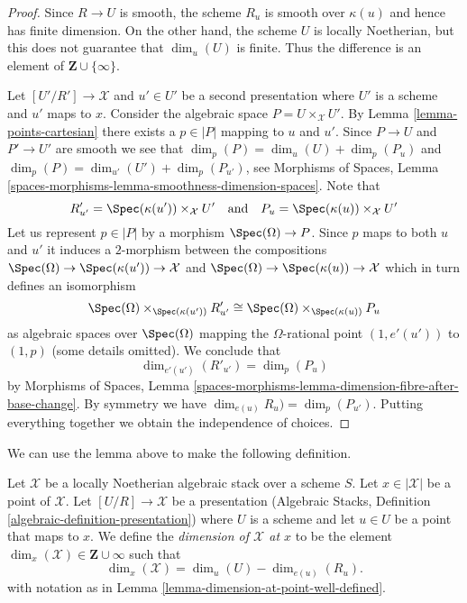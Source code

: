 \begin{proof}
Since $R \to U$ is smooth, the scheme $R_u$ is smooth over $\kappa(u)$
and hence has finite dimension. On the other hand, the scheme $U$
is locally Noetherian, but this does not guarantee that
$\dim_u(U)$ is finite. Thus the difference is an element of
$\mathbf{Z} \cup \{\infty\}$.

\medskip\noindent
Let $[U'/R'] \to \mathcal{X}$ and $u' \in U'$ be a second presentation
where $U'$ is a scheme and $u'$ maps to $x$. Consider the algebraic
space $P = U \times_\mathcal{X} U'$. By
Lemma \ref{lemma-points-cartesian} there exists a $p \in |P|$ mapping to
$u$ and $u'$. Since $P \to U$ and $P' \to U'$ are smooth we see that
$\dim_p(P) = \dim_u(U) + \dim_p(P_u)$ and
$\dim_p(P) = \dim_{u'}(U') + \dim_p(P_{u'})$, see
Morphisms of Spaces, Lemma
\ref{spaces-morphisms-lemma-smoothness-dimension-spaces}.
Note that
$$
R'_{u'} = \Spec(\kappa(u')) \times_\mathcal{X} U'
\quad\text{and}\quad
P_u = \Spec(\kappa(u)) \times_\mathcal{X} U'
$$
Let us represent $p \in |P|$ by a morphism $\Spec(\Omega) \to P$.
Since $p$ maps to both $u$ and $u'$ it induces a $2$-morphism
between the compositions
$\Spec(\Omega) \to \Spec(\kappa(u')) \to \mathcal{X}$ and
$\Spec(\Omega) \to \Spec(\kappa(u)) \to \mathcal{X}$
which in turn defines an isomorphism
$$
\Spec(\Omega) \times_{\Spec(\kappa(u'))} R'_{u'}
\cong
\Spec(\Omega) \times_{\Spec(\kappa(u))} P_u
$$
as algebraic spaces over $\Spec(\Omega)$ mapping the $\Omega$-rational
point $(1, e'(u'))$ to $(1, p)$ (some details omitted). We conclude that
$$
\dim_{e'(u')}(R'_{u'}) = \dim_p(P_u)
$$
by Morphisms of Spaces, Lemma
\ref{spaces-morphisms-lemma-dimension-fibre-after-base-change}.
By symmetry we have
$\dim_{e(u)}R_u) = \dim_p(P_{u'})$.
Putting everything together we obtain the independence of choices.
\end{proof}

\noindent
We can use the lemma above to make the following definition.

\begin{definition}
\label{definition-dimension-at-point}
Let $\mathcal{X}$ be a locally Noetherian algebraic stack over a scheme $S$.
Let $x \in |\mathcal{X}|$ be a point of $\mathcal{X}$.
Let $[U/R] \to \mathcal{X}$ be a presentation
(Algebraic Stacks, Definition \ref{algebraic-definition-presentation})
where $U$ is a scheme
and let $u \in U$ be a point that maps to $x$.
We define the {\it dimension of $\mathcal{X}$ at $x$} to be
the element $\dim_x(\mathcal{X}) \in \mathbf{Z} \cup \infty$
such that 
$$
\dim_x(\mathcal{X}) = \dim_u(U)-\dim_{e(u)}(R_u).
$$
with notation as in Lemma \ref{lemma-dimension-at-point-well-defined}.
\end{definition}

